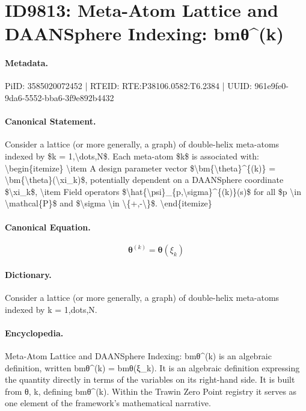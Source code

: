 \section*{ID9813: Meta-Atom Lattice and DAANSphere Indexing: bmθ\textasciicircum{}(k)}
\paragraph{Metadata.}
PiID: 3585020072452 | RTEID: RTE:P38106.0582:T6.2384 | UUID: 961e9fe0-9da6-5552-bba6-3f9e892b4432

\paragraph{Canonical Statement.}
Consider a lattice (or more generally, a graph) of double-helix meta-atoms indexed by \$k = 1,\textbackslash{}dots,N\$. Each meta-atom \$k\$ is associated with: \textbackslash{}begin\{itemize\} \textbackslash{}item A design parameter vector \$\textbackslash{}bm\{\textbackslash{}theta\}\textasciicircum{}\{(k)\} = \textbackslash{}bm\{\textbackslash{}theta\}(\textbackslash{}xi\_k)\$, potentially dependent on a DAANSphere coordinate \$\textbackslash{}xi\_k\$, \textbackslash{}item Field operators \$\textbackslash{}hat\{\textbackslash{}psi\}\_\{p,\textbackslash{}sigma\}\textasciicircum{}\{(k)\}(s)\$ for all \$p \textbackslash{}in \textbackslash{}mathcal\{P\}\$ and \$\textbackslash{}sigma \textbackslash{}in \textbackslash{}\{+,-\textbackslash{}\}\$. \textbackslash{}end\{itemize\}

\paragraph{Canonical Equation.}
\[
\bm{\theta}^{(k)} = \bm{\theta}(\xi_k)
\]

\paragraph{Dictionary.}
Consider a lattice (or more generally, a graph) of double-helix meta-atoms indexed by k = 1,dots,N.

\paragraph{Encyclopedia.}
Meta-Atom Lattice and DAANSphere Indexing: bmθ\textasciicircum{}(k) is an algebraic definition, written bmθ\textasciicircum{}(k) = bmθ(ξ\_k). It is an algebraic definition expressing the quantity directly in terms of the variables on its right-hand side. It is built from θ, k, defining bmθ\textasciicircum{}(k). Within the Trawin Zero Point registry it serves as one element of the framework's mathematical narrative.
